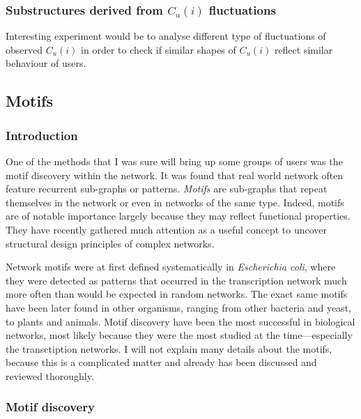     \subsubsection{Substructures derived from $C_u(i)$ fluctuations}
    
      Interesting experiment would be to analyse different type of fluctuations of observed $C_u(i)$ in order to check if similar shapes of $C_u(i)$ reflect similar behaviour of users.

  \subsection{Motifs}
  
    \subsubsection{Introduction}
      
      One of the methods that I was sure will bring up some groups of users was the motif discovery within the network. It was found that real world network often feature recurrent sub-graphs or patterns. \emph{Motifs} are sub-graphs that repeat themselves in the network or even in networks of the same type. Indeed, motifs are of notable importance largely because they may reflect functional properties. They have recently gathered much attention as a useful concept to uncover structural design principles of complex networks\cite{MasoudiSchreiberKashani2012}.
      
      Network motifs were at first defined systematically in \emph{Escherichia coli}, where they were detected as patterns that occurred in the transcription network much more often than would be expected in random networks\cite{MiloAlon2002}. The exact same motifs have been later found in other organisms, ranging from other bacteria\cite{ManganZaslaverAlon2003,Eichenberger2004} and yeast\cite{MiloAlon2002, Lee2002}, to plants\cite{Saddic2006} and animals\cite{Boyer2005}. Motif discovery have been the most successful in biological networks, most likely because they were the most studied at the time---especially the transctiption networks. I will not explain many details about the motifs, because this is a complicated matter and already has been discussed and reviewed thoroughly\cite{Alon2007}.
      
    \subsubsection{Motif discovery}
    
